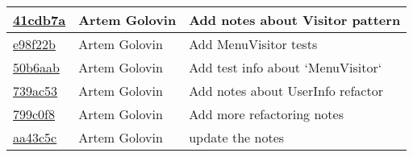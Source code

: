 \begin{tabularx}{\textwidth}{l l X}
\href{https://github.com/awave1/assessment-loan-system/commit/41cdb7ab509e211045f1ca0a6833fd9d63b7f080}{41cdb7a} & Artem Golovin & Add notes about Visitor pattern\\ \hline
\href{https://github.com/awave1/assessment-loan-system/commit/e98f22b6e76694db631b930e29440f1af8a095e6}{e98f22b} & Artem Golovin & Add MenuVisitor tests\\ \hline
\href{https://github.com/awave1/assessment-loan-system/commit/50b6aabb711f6b0e131d486def424fd362f43fc6}{50b6aab} & Artem Golovin & Add test info about `MenuVisitor`\\ \hline
\href{https://github.com/awave1/assessment-loan-system/commit/739ac5380277b0c72d2a0fd6254aba5f6bffaade}{739ac53} & Artem Golovin & Add notes about UserInfo refactor\\ \hline
\href{https://github.com/awave1/assessment-loan-system/commit/799c0f87e615a6c5ac3d5cec3c60c9cd95ccd4bd}{799c0f8} & Artem Golovin & Add more refactoring notes\\ \hline
\href{https://github.com/awave1/assessment-loan-system/commit/aa43c5c5d03930bdb6b1abbb49146646f9c70110}{aa43c5c} & Artem Golovin & update the notes\\ \hline
\end{tabularx}
